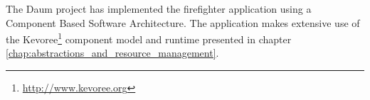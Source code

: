 The Daum project has implemented the firefighter application using a Component Based Software Architecture.  The application makes extensive use of the Kevoree\footnote{\url{http://www.kevoree.org}\label{note:kevoree}} component model and runtime presented in chapter \ref{chap:abstractions_and_resource_management}.


